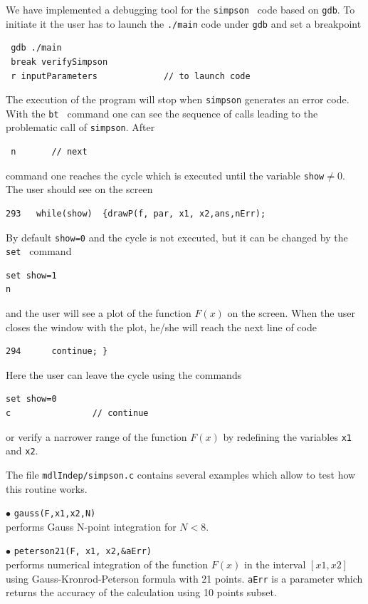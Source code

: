 \documentclass[12pt,a4paper]{article}
\begin{document}
We have implemented a debugging tool for the {\tt simpson } code based on {\tt  gdb}. To initiate it the user
has to launch the {\tt ./main} code under {\tt gdb} and set a breakpoint 
\begin{verbatim}
 gdb ./main
 break verifySimpson
 r inputParameters             // to launch code 
\end{verbatim}
The execution of the program will stop when {\tt simpson} generates an error code. With the {\tt  bt }
command one can see the sequence of calls leading to the problematic  call  of  {\tt simpson}. After 
\begin{verbatim}
 n       // next 
\end{verbatim}
command one reaches the  cycle which is executed until the  variable {\tt show}$\ne 0$. The user should see on the
screen
\begin{verbatim}
293	  while(show)  {drawP(f, par, x1, x2,ans,nErr); 
\end{verbatim}
 By default {\tt show=0}
and the cycle is not executed, but it can be changed by the {\tt set } command    
\begin{verbatim}
set show=1
n
\end{verbatim}
and the user  will see a plot of the  function $F(x)$ on the screen. When the user closes the window with the plot, he/she
will reach the next line of code
\begin{verbatim}
294	     continue; } 
\end{verbatim}
Here the user can leave the cycle using the commands
\begin{verbatim}
set show=0
c                // continue
\end{verbatim} 
or verify a narrower range   of the function $F(x)$ by redefining the variables {\tt x1} and {\tt x2}. 

The file \verb|mdlIndep/simpson.c|  contains several examples which allow to test how this routine works.


\noindent$\bullet$ \verb|gauss(F,x1,x2,N)|\\
performs Gauss N-point integration for $N<8$.  


\noindent$\bullet$ \verb|peterson21(F, x1, x2,&aErr)|\\
performs numerical integration of the function $F(x)$ in the interval $[x1,x2]$ using Gauss-Kronrod-Peterson formula with 21 points. {\tt aErr} is a  parameter which returns the accuracy of the calculation using 10 points subset.  
\end{document}
